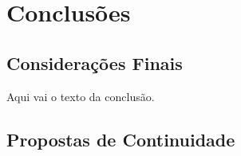 \chapter{Conclusões}

\section{Considerações Finais}

Aqui vai o texto da conclusão.

\section{Propostas de Continuidade}


\clearpage
